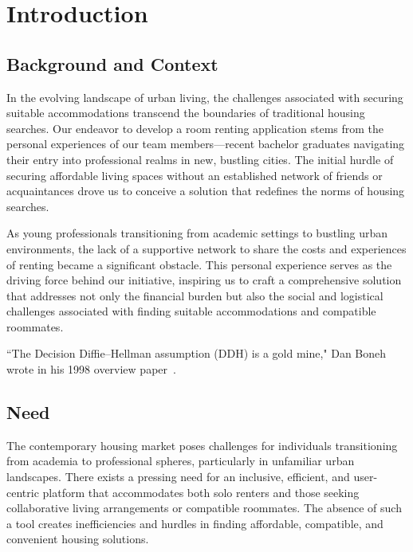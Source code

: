 
\chapter{Introduction}

\label{Chapter1}

\section{Background and Context}
In the evolving landscape of urban living, the challenges associated with
securing suitable accommodations transcend the boundaries of traditional
housing searches. Our endeavor to develop a room renting application stems
from the personal experiences of our team members—recent bachelor graduates
navigating their entry into professional realms in new, bustling cities.
The initial hurdle of securing affordable living spaces without an established
network of friends or acquaintances drove us to conceive a solution that
redefines the norms of housing searches.\par

\medskip

As young professionals transitioning from academic settings to bustling urban
environments, the lack of a supportive network to share the costs and experiences
of renting became a significant obstacle. This personal experience serves as the
driving force behind our initiative, inspiring us to craft a comprehensive
solution that addresses not only the financial burden but also the social and
logistical challenges associated with finding suitable accommodations and
compatible roommates.

\bigskip
``The Decision Diffie–Hellman assumption (DDH) is a gold mine," Dan Boneh wrote in his 1998
overview paper~\cite{boneh2006decision}.

\section{Need}
The contemporary housing market poses challenges for individuals transitioning
from academia to professional spheres, particularly in unfamiliar urban
landscapes. There exists a pressing need for an inclusive, efficient, and
user-centric platform that accommodates both solo renters and those seeking
collaborative living arrangements or compatible roommates. The absence of such
a tool creates inefficiencies and hurdles in finding affordable, compatible,
and convenient housing solutions.

